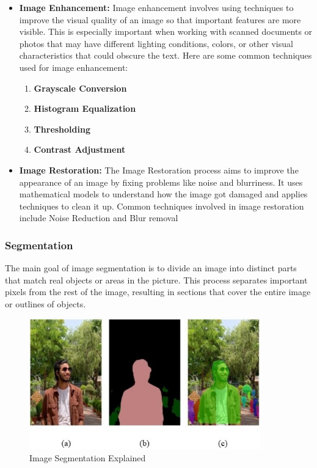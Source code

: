 \documentclass[12pt,oneside,openright,a4paper]{cpe-english-project}
\begin{document}
\begin{itemize}
    \item \textbf{Image Enhancement:}  Image enhancement involves using techniques to improve the visual quality of an image so that important features are more visible. This is especially important when working with scanned documents or photos that may have different lighting conditions, colors, or other visual characteristics that could obscure the text. Here are some common techniques used for image enhancement:
	\begin{enumerate}
    		\item \textbf{Grayscale Conversion}
    		\item \textbf{Histogram Equalization}
   		 \item \textbf{Thresholding}
   		 \item \textbf{Contrast Adjustment}
	\end{enumerate}
 
    \item \textbf{Image Restoration:} The Image Restoration process aims to improve the appearance of an image by fixing problems like noise and blurriness. It uses mathematical models to understand how the image got damaged and applies techniques to clean it up. Common techniques involved in image restoration include Noise Reduction and Blur removal 
\end{itemize}

\subsubsection{Segmentation} The main goal of image segmentation is to divide an image into distinct parts that match real objects or areas in the picture. This process separates important pixels from the rest of the image, resulting in sections that cover the entire image or outlines of objects.

\begin{figure}[H]
\centering
\includegraphics[width=10cm]{./assets/segmentation.jpg}
\caption{Image Segmentation Explained}\label{fig:figure-2.1}
\end{figure}
\end{document}
